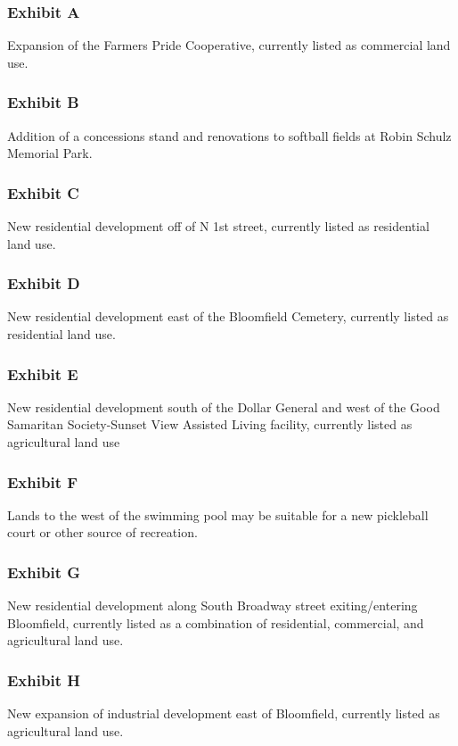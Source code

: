 \subsubsection*{Exhibit A}

\noindent Expansion of the Farmers Pride Cooperative, currently listed as commercial land use.

\subsubsection*{Exhibit B}

\noindent Addition of a concessions stand and renovations to softball fields at Robin Schulz Memorial Park.

\subsubsection*{Exhibit C}

\noindent New residential development off of N 1st street, currently listed as residential land use.

\subsubsection*{Exhibit D}

\noindent New residential development east of the Bloomfield Cemetery, currently listed as residential land use.

\subsubsection*{Exhibit E}

\noindent New residential development south of the Dollar General and west of the Good Samaritan Society-Sunset View Assisted Living facility, currently listed as agricultural land use

\subsubsection*{Exhibit F}

\noindent Lands to the west of the swimming pool may be suitable for a new pickleball court or other source of recreation.

\subsubsection*{Exhibit G}

\noindent New residential development along South Broadway street exiting/entering Bloomfield, currently listed as a combination of residential, commercial, and agricultural land use.

\subsubsection*{Exhibit H}

\noindent New expansion of industrial development east of Bloomfield, currently listed as agricultural land use.